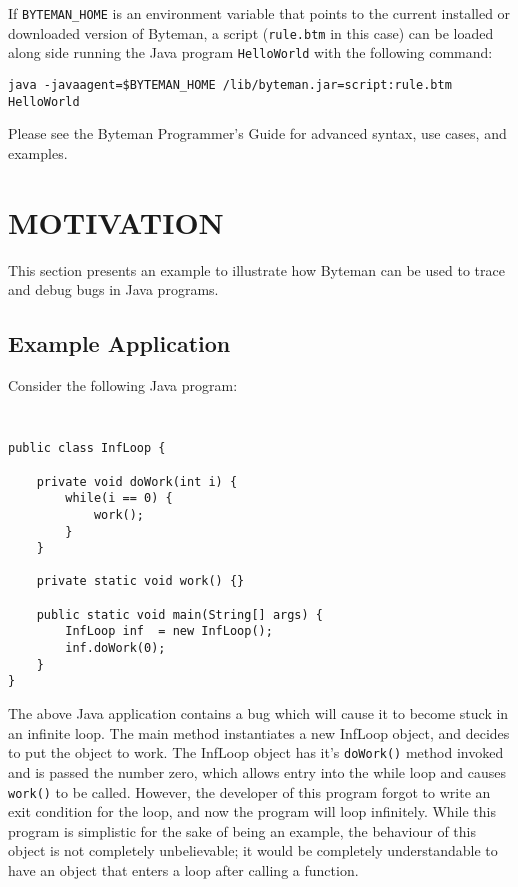 \documentclass[letterpaper,twocolumn,10pt]{article}
\begin{document}
If {\tt BYTEMAN\_HOME} is an environment variable that points to the current installed or downloaded version of Byteman, a script ({\tt rule.btm} in this case) can be loaded along side running the Java program {\tt HelloWorld} with the following command:

\begin{center}
\noindent
{\tt java -javaagent=\$BYTEMAN\_HOME
/lib/byteman.jar=script:rule.btm HelloWorld}
\end{center}

\noindent
Please see the Byteman Programmer's Guide\cite{bytemanguide} for advanced syntax, use cases, and examples.


\section{MOTIVATION}

This section presents an example to illustrate how Byteman can be used to trace and debug bugs in Java programs.

\subsection{Example Application}

Consider the following Java program:
{\tt \small
\begin{verbatim}
public class InfLoop {

    private void doWork(int i) {
        while(i == 0) {
            work();
        }
    }

    private static void work() {}

    public static void main(String[] args) { 
        InfLoop inf  = new InfLoop();
        inf.doWork(0);
    }
}
\end{verbatim}
}

The above Java application contains a bug which will cause it to become stuck in an infinite loop. The main method instantiates a new InfLoop object, and decides to put the object to work. The InfLoop object has it's {\tt doWork()} method invoked and is passed the number zero, which allows entry into the while loop and causes {\tt work()} to be called. However, the developer of this program forgot to write an exit condition for the loop, and now the program will loop infinitely. While this program is simplistic for the sake of being an example, the behaviour of this object is not completely unbelievable; it would be completely understandable to have an object that enters a loop after calling a function.
\end{document}
